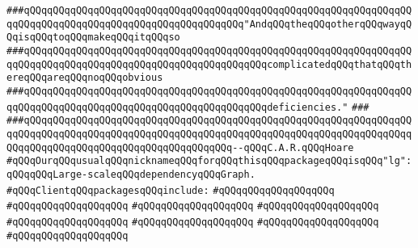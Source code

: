 \verb|###qQQqqQQqqQQqqQQqqQQqqQQqqQQqqQQqqQQqqQQqqQQqqQQqqQQqqQQqqQQqqQQqqQQqqQQqqQQqqQQqqQQqqQQqqQQqqQQqqQQqqQQqqQQq"AndqQQqtheqQQqotherqQQqwayqQQqisqQQqtoqQQqmakeqQQqitqQQqso|\newline
\verb|###qQQqqQQqqQQqqQQqqQQqqQQqqQQqqQQqqQQqqQQqqQQqqQQqqQQqqQQqqQQqqQQqqQQqqQQqqQQqqQQqqQQqqQQqqQQqqQQqqQQqqQQqqQQqqQQqcomplicatedqQQqthatqQQqthereqQQqareqQQqnoqQQqobvious|\newline
\verb|###qQQqqQQqqQQqqQQqqQQqqQQqqQQqqQQqqQQqqQQqqQQqqQQqqQQqqQQqqQQqqQQqqQQqqQQqqQQqqQQqqQQqqQQqqQQqqQQqqQQqqQQqqQQqqQQqdeficiencies."|\newline
\verb|###|\newline
\verb|###qQQqqQQqqQQqqQQqqQQqqQQqqQQqqQQqqQQqqQQqqQQqqQQqqQQqqQQqqQQqqQQqqQQqqQQqqQQqqQQqqQQqqQQqqQQqqQQqqQQqqQQqqQQqqQQqqQQqqQQqqQQqqQQqqQQqqQQqqQQqqQQqqQQqqQQqqQQqqQQqqQQqqQQqqQQqqQQq--qQQqC.A.R.qQQqHoare|\newline
\newline
\verb|#qQQqOurqQQqusualqQQqnicknameqQQqforqQQqthisqQQqpackageqQQqisqQQq"lg":qQQqqQQqLarge-scaleqQQqdependencyqQQqGraph.|\newline
\newline
\verb|#qQQqClientqQQqpackagesqQQqinclude:|\newline
\verb|#qQQqqQQqqQQqqQQqqQQq|\newline
\verb|#qQQqqQQqqQQqqQQqqQQq|\newline
\verb|#qQQqqQQqqQQqqQQqqQQq|\newline
\verb|#qQQqqQQqqQQqqQQqqQQq|\newline
\verb|#qQQqqQQqqQQqqQQqqQQq|\newline
\verb|#qQQqqQQqqQQqqQQqqQQq|\newline
\verb|#qQQqqQQqqQQqqQQqqQQq|\newline
\verb|#qQQqqQQqqQQqqQQqqQQq|\newline
